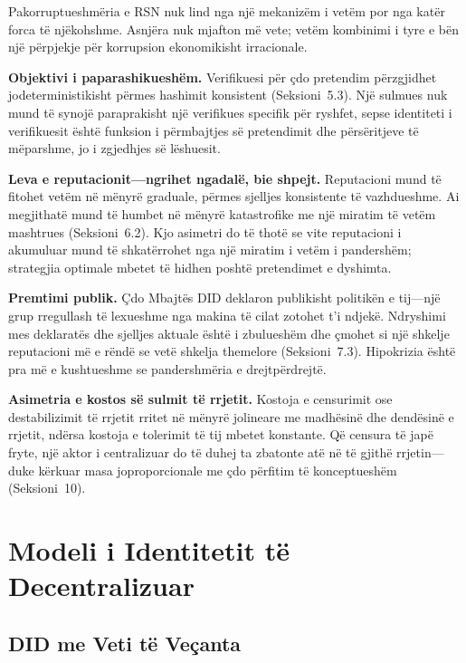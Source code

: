 \documentclass[11pt,a4paper,twocolumn]{article}
\begin{document}
Pakorruptueshmëria e RSN nuk lind nga një mekanizëm i vetëm por nga katër forca të njëkohshme. Asnjëra nuk mjafton më vete; vetëm kombinimi i tyre e bën një përpjekje për korrupsion ekonomikisht irracionale.

\textbf{Objektivi i paparashikueshëm.} Verifikuesi për çdo pretendim përzgjidhet jodeterministikisht përmes hashimit konsistent (Seksioni~5.3). Një sulmues nuk mund të synojë paraprakisht një verifikues specifik për ryshfet, sepse identiteti i verifikuesit është funksion i përmbajtjes së pretendimit dhe përsëritjeve të mëparshme, jo i zgjedhjes së lëshuesit.

\textbf{Leva e reputacionit---ngrihet ngadalë, bie shpejt.} Reputacioni mund të fitohet vetëm në mënyrë graduale, përmes sjelljes konsistente të vazhdueshme. Ai megjithatë mund të humbet në mënyrë katastrofike me një miratim të vetëm mashtrues (Seksioni~6.2). Kjo asimetri do të thotë se vite reputacioni i akumuluar mund të shkatërrohet nga një miratim i vetëm i pandershëm; strategjia optimale mbetet të hidhen poshtë pretendimet e dyshimta.

\textbf{Premtimi publik.} Çdo Mbajtës DID deklaron publikisht politikën e tij---një grup rregullash të lexueshme nga makina të cilat zotohet t'i ndjekë. Ndryshimi mes deklaratës dhe sjelljes aktuale është i zbulueshëm dhe çmohet si një shkelje reputacioni më e rëndë se vetë shkelja themelore (Seksioni~7.3). Hipokrizia është pra më e kushtueshme se pandershmëria e drejtpërdrejtë.

\textbf{Asimetria e kostos së sulmit të rrjetit.} Kostoja e censurimit ose destabilizimit të rrjetit rritet në mënyrë jolineare me madhësinë dhe dendësinë e rrjetit, ndërsa kostoja e tolerimit të tij mbetet konstante. Që censura të japë fryte, një aktor i centralizuar do të duhej ta zbatonte atë në të gjithë rrjetin---duke kërkuar masa joproporcionale me çdo përfitim të konceptueshëm (Seksioni~10).

\section{Modeli i Identitetit të Decentralizuar}

\subsection{DID me Veti të Veçanta}
\end{document}
